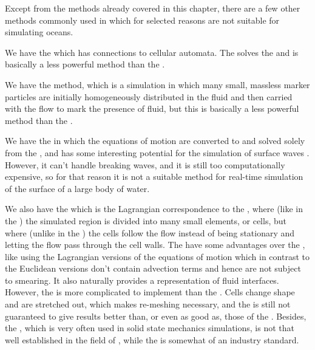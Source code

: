 Except from the methods already covered in this chapter, there are a few other methods commonly used in \CFD which for selected reasons are not suitable for simulating oceans.

We have the \LBM which has connections to cellular automata. The \LBM solves the  and is basically a less powerful \CFD method than the \FVM.

We have the \MAC method, which is a \FVM simulation in which many small, massless marker particles are initially homogeneously distributed in the fluid and then carried with the flow to mark the presence of fluid, but this is basically a less powerful method than the .

We have the \BEM in which the equations of motion are converted to  and solved solely from the \boundaries, and has some interesting potential for the simulation of surface waves \citep{Grilli2009}. However, it can't handle breaking waves, and it is still too computationally expensive, so for that reason it is not a suitable method for real-time simulation of the surface of a large body of water.

We also have the \FEM which is the Lagrangian correspondence to the \FVM, where (like in the \FVM) the simulated region is divided into many small elements, or cells, but where (unlike in the \FVM) the cells follow the flow instead of being stationary and letting the flow pass through the cell walls. The \FEM have some advantages over the \FVM, like using the Lagrangian versions of the equations of motion which in contrast to the Euclidean versions don't contain advection terms and hence are not subject to smearing. It also naturally provides a representation of fluid interfaces. However, the \FEM is more complicated to implement than the \FVM. Cells change shape and are stretched out, which makes re-meshing necessary, and the \FEM is still not guaranteed to give results better than, or even as good as, those of the \FVM. Besides, the \FEM, which is very often used in solid state mechanics simulations, is not that well established in the field of \CFD, while the \FVM is somewhat of an industry standard.